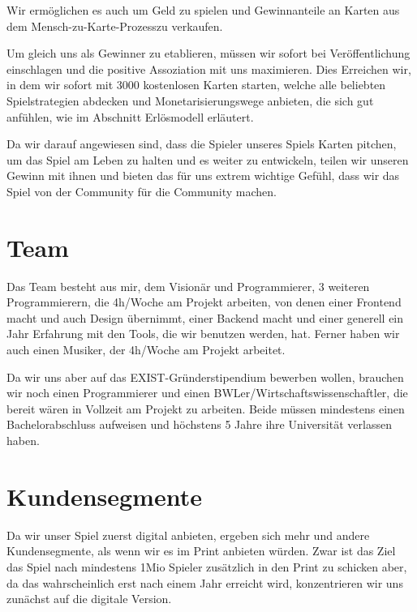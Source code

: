 \documentclass[fontsize=11, a4aper]{scrartcl}
\begin{document}
\noindent Wir ermöglichen es auch um Geld zu spielen und Gewinnanteile an Karten aus dem \glqq Mensch-zu-Karte-Prozess\grqq zu verkaufen.\hfill\newline

\noindent Um gleich uns als Gewinner zu etablieren, müssen wir sofort bei Veröffentlichung einschlagen und die positive Assoziation mit uns maximieren. Dies Erreichen wir, in dem wir sofort mit 3000 kostenlosen Karten starten, welche alle beliebten Spielstrategien abdecken und Monetarisierungswege anbieten, die sich gut anfühlen, wie im Abschnitt \glqq Erlösmodell\grqq{} erläutert.\hfill\newline

\noindent Da wir darauf angewiesen sind, dass die Spieler unseres Spiels Karten pitchen, um das Spiel am Leben zu halten und es weiter zu entwickeln, teilen wir unseren Gewinn mit ihnen und bieten das für uns extrem wichtige Gefühl, dass wir das Spiel von der Community für die Community machen.

\section{Team} \label{sec:Team}

Das Team besteht aus mir, dem Visionär und Programmierer, 3 weiteren Programmierern, die 4h/Woche am Projekt arbeiten, von denen einer Frontend macht und auch Design übernimmt, einer Backend macht und einer generell ein Jahr Erfahrung mit den Tools, die wir benutzen werden, hat. Ferner haben wir auch einen Musiker, der 4h/Woche am Projekt arbeitet.\hfill\newline

\noindent Da wir uns aber auf das EXIST-Gründerstipendium bewerben wollen, brauchen wir noch einen Programmierer und einen BWLer/Wirtschaftswissenschaftler, die bereit wären in Vollzeit am Projekt zu arbeiten. Beide müssen mindestens einen Bachelorabschluss aufweisen und höchstens 5 Jahre ihre Universität verlassen haben.

\section{Kundensegmente} \label{sec:Kundensegmente}

Da wir unser Spiel zuerst digital anbieten, ergeben sich mehr und andere Kundensegmente, als wenn wir es im Print anbieten würden. Zwar ist das Ziel das Spiel nach mindestens 1Mio Spieler zusätzlich in den Print zu schicken aber, da das wahrscheinlich erst nach einem Jahr erreicht wird, konzentrieren wir uns zunächst auf die digitale Version.
\end{document}
